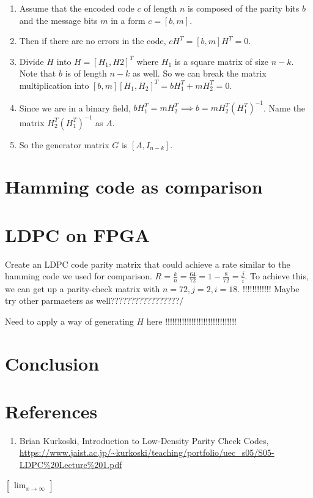 \documentclass[letterpaper,12pt,oneside]{article}
\begin{document}
\begin{enumerate}
    \item Assume that the encoded code $c$ of length $n$ is composed of the parity bits $b$ and the message bits $m$ in a form $c = [b, m]$.
    \item Then if there are no errors in the code, $cH^T = [b, m]H^T = 0$.
    \item Divide $H$ into $H = [H_1, H2]^T$ where $H_1$ is a square matrix of size $n-k$. Note that $b$ is of length $n-k$ as well. So we can break the matrix multiplication into $[b, m][H_1, H_2]^T = bH_1^T + mH_2^T = 0$.
    \item Since we are in a binary field, $bH_1^T = mH_2^T \implies b = mH_2^T(H_1^T)^{-1}$. Name the matrix $H_2^T(H_1^T)^{-1}$ as $A$.
    \item So the generator matrix $G$ is $[A, I_{n-k}]$.
\end{enumerate}

\section{Hamming code as comparison}
\section{LDPC on FPGA}
Create an LDPC code parity matrix that could achieve a rate similar to the hamming code we used for comparison. $R=\frac{k}{n}=\frac{64}{72}=1-\frac{8}{72} = \frac{j}{i}$. To achieve this, we can get up a parity-check matrix with $n=72, j=2, i=18$.  !!!!!!!!!!!! Maybe try other parmaeters as well?????????????????/

Need to apply a way of generating $H$ here !!!!!!!!!!!!!!!!!!!!!!!!!!!!!!
\section{Conclusion}
\section{References}
\begin{enumerate}
    \item \label{[1]} Brian Kurkoski, Introduction to Low-Density Parity Check Codes, \url{https://www.jaist.ac.jp/~kurkoski/teaching/portfolio/uec_s05/S05-LDPC%20Lecture%201.pdf}
\end{enumerate}





$\begin{bmatrix}
    \lim_{x\to \infty}
\end{bmatrix}$
\end{document}
